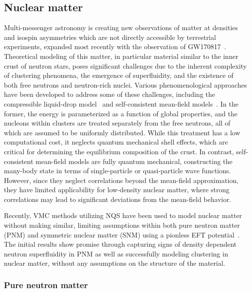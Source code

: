 \subsection{Nuclear matter}
\label{sub:matter}

Multi-messenger astronomy is creating new observations of matter at densities and isospin asymmetries which are not directly accessible by terrestrial experiments, expanded most recently with the observation of GW170817~\cite{LIGOScientific:2017vwq,Abbott:2017,Sabatucci:2020xwt,senger2021}. Theoretical modeling of this matter, in particular material similar to the inner crust of neutron stars, poses significant challenges due to the inherent complexity of clustering phenomena, the emergence of superfluidity, and the existence of both free neutrons and neutron-rich nuclei. Various phenomenological approaches have been developed to address some of these challenges, including the compressible liquid-drop model~\cite{ Baym:1971ax,Baym:1971pw,Ravenhall:1983uh,douchin2001,Newton:2011dw,Gulminelli:2015csa,Lim:2017luh,Carreau:2019zdy,Grams:2021lzx} and self-consistent mean-field models~\cite{negele1973a,Baldo:2006jr,Grill:2011dr}. In the former, the energy is parameterized as a function of global properties, and the nucleons within clusters are treated separately from the free neutrons, all of which are assumed to be uniformly distributed. While this treatment has a low computational cost, it neglects quantum mechanical shell effects, which are critical for determining the equilibrium composition of the crust. In contrast, self-consistent mean-field models are fully quantum mechanical, constructing the many-body state in terms of single-particle or quasi-particle wave functions. However, since they neglect correlations beyond the mean-field approximation, they have limited applicability for low-density nuclear matter, where strong correlations may lead to significant deviations from the mean-field behavior.

Recently, VMC methods utilizing NQS have been used to model nuclear matter without making similar, limiting assumptions within both pure neutron matter (PNM) and symmetric nuclear matter (SNM) using a pionless EFT potential~\cite{fore2023,fore_investigating_2024}. The initial results show promise through capturing signs of density dependent neutron superfluidity in PNM as well as successfully modeling clustering in nuclear matter, without any assumptions on the structure of the material.


\subsubsection{Pure neutron matter}

